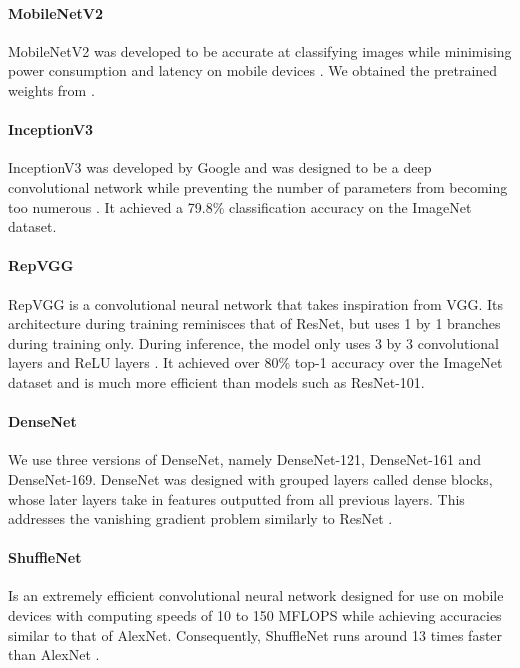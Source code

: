 \documentclass{article}
\begin{document}
\paragraph{MobileNetV2} MobileNetV2 was developed to be accurate at classifying images while minimising power consumption and latency on mobile devices \cite{DBLP:journals/corr/abs-1905-02244}. We obtained the pretrained weights from \cite{Chen-pytorch-cifar-models}.

\paragraph{InceptionV3} InceptionV3 was developed by Google and was designed to be a deep convolutional network while preventing the number of parameters from becoming too numerous \cite{DBLP:journals/corr/SzegedyVISW15}. It achieved a 79.8\% classification accuracy on the ImageNet dataset.

\paragraph{RepVGG} RepVGG is a convolutional neural network that takes inspiration from VGG. Its architecture during training reminisces that of ResNet, but uses 1 by 1 branches during training only. During inference, the model only uses 3 by 3 convolutional layers and ReLU layers \cite{DBLP:journals/corr/abs-2101-03697}. It achieved over 80\% top-1 accuracy over the ImageNet dataset and is much more efficient than models such as ResNet-101.

\paragraph{DenseNet} We use three versions of DenseNet, namely DenseNet-121, DenseNet-161 and DenseNet-169. DenseNet was designed with grouped layers called dense blocks, whose later layers take in features outputted from all previous layers. This addresses the vanishing gradient problem similarly to ResNet \cite{DBLP:journals/corr/HuangLW16a}.

\paragraph{ShuffleNet} Is an extremely efficient convolutional neural network designed for use on mobile devices with computing speeds of 10 to 150 MFLOPS while achieving accuracies similar to that of AlexNet. Consequently, ShuffleNet runs around 13 times faster than AlexNet \cite{DBLP:journals/corr/ZhangZLS17}.
\end{document}
